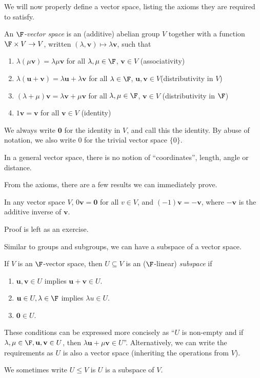 \documentclass[a4paper]{article}
\begin{document}
We will now properly define a vector space, listing the axioms they are required to satisfy.
\begin{defi}
  An \emph{$\F$-vector space} is an (additive) abelian group $V$ together with a function $\F \times V \to V$, written $(\lambda, \mathbf{v}) \mapsto \lambda \mathbf{v}$, such that
  \begin{enumerate}
    \item $\lambda(\mu \mathbf{v}) = \lambda \mu \mathbf{v}$ for all $\lambda, \mu \in \F$, $\mathbf{v}\in V$ \hfill (associativity)
    \item $\lambda(\mathbf{u} + \mathbf{v}) = \lambda \mathbf{u} + \lambda \mathbf{v}$ for all $\lambda\in \F$, $\mathbf{u}, \mathbf{v}\in V$\hfill (distributivity in $V$)
    \item $(\lambda + \mu) \mathbf{v} = \lambda \mathbf{v} + \mu \mathbf{v}$ for all $\lambda, \mu \in \F$, $\mathbf{v}\in V$ \hfill (distributivity in $\F$)
    \item $1\mathbf{v} = \mathbf{v}$ for all $\mathbf{v}\in V$ \hfill (identity)
  \end{enumerate}

  We always write $\mathbf{0}$ for the identity in $V$, and call this the identity. By abuse of notation, we also write $0$ for the trivial vector space $\{0\}$.
\end{defi}
In a general vector space, there is no notion of ``coordinates'', length, angle or distance.

From the axioms, there are a few results we can immediately prove.
\begin{prop}
  In any vector space $V$, $0\mathbf{v} = \mathbf{0}$ for all $v\in V$, and $(-1)\mathbf{v} = -\mathbf{v}$, where $-\mathbf{v}$ is the additive inverse of $\mathbf{v}$.
\end{prop}
Proof is left as an exercise.

Similar to groups and subgroups, we can have a subspace of a vector space.
\begin{defi}[Subspace]
  If $V$ is an $\F$-vector space, then $U\subseteq V$ is an ($\F$-linear) \emph{subspace} if
  \begin{enumerate}
    \item $\mathbf{u}, \mathbf{v}\in U$ implies $\mathbf{u} + \mathbf{v} \in U$.
    \item $\mathbf{u}\in U, \lambda \in \F$ implies $\lambda u\in U$.
    \item $\mathbf{0}\in U$.
  \end{enumerate}
  These conditions can be expressed more concisely as ``$U$ is non-empty and if $\lambda, \mu\in \F, \mathbf{u}, \mathbf{v}\in U$, then $\lambda \mathbf{u} + \mu \mathbf{v}\in U$''. Alternatively, we can write the requirements as $U$ is also a vector space (inheriting the operations from $V$).

  We sometimes write $U\leq V$ is $U$ is a subspace of $V$.
\end{defi}
\end{document}

